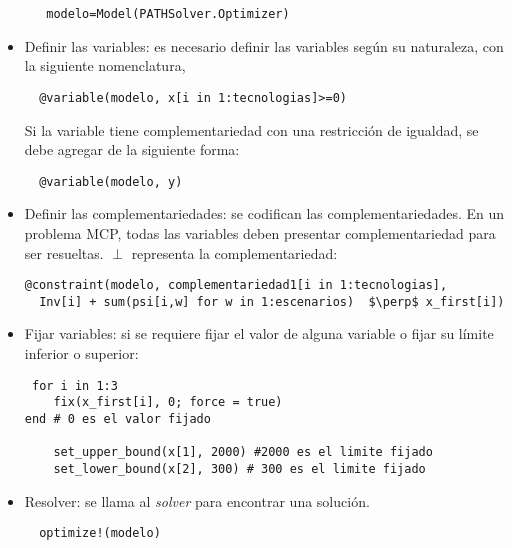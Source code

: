 \begin{itemize}
   \begin{footnotesize}
   \begin{lstlisting}
   modelo=Model(PATHSolver.Optimizer)
   \end{lstlisting}
   \end{footnotesize}
   
   \item Definir las variables: es necesario definir las variables según su naturaleza, con la siguiente nomenclatura,
   
   \begin{footnotesize}
   \begin{lstlisting}
  @variable(modelo, x[i in 1:tecnologias]>=0)
   \end{lstlisting}
   \end{footnotesize}
   Si la variable tiene complementariedad con una restricción de igualdad, se debe agregar de la siguiente forma:
   \begin{footnotesize}
   \begin{lstlisting}
  @variable(modelo, y)
   \end{lstlisting}
   \end{footnotesize}
   
  
  \item Definir las complementariedades: se codifican las complementariedades. En un problema MCP, todas las variables deben presentar complementariedad para ser resueltas. $\perp$ representa la complementariedad:
  
  \begin{footnotesize}
  \begin{lstlisting}[mathescape=true]
  @constraint(modelo, complementariedad1[i in 1:tecnologias],  
  Inv[i] + sum(psi[i,w] for w in 1:escenarios)  $\perp$ x_first[i])
  \end{lstlisting}
  \end{footnotesize}
  
  \item Fijar variables: si se requiere fijar el valor de alguna variable o fijar su límite inferior o superior:
  
  \begin{footnotesize}
  \begin{lstlisting}
 for i in 1:3
    fix(x_first[i], 0; force = true) 
end # 0 es el valor fijado
    
    set_upper_bound(x[1], 2000) #2000 es el limite fijado
    set_lower_bound(x[2], 300) # 300 es el limite fijado
  \end{lstlisting}
  \end{footnotesize}
  
  
  \item  Resolver: se llama al \textit{solver} para encontrar una solución.
  
  \begin{footnotesize}
   \begin{lstlisting}
  optimize!(modelo)
  \end{lstlisting}
  \end{footnotesize}
 
\end{itemize}

